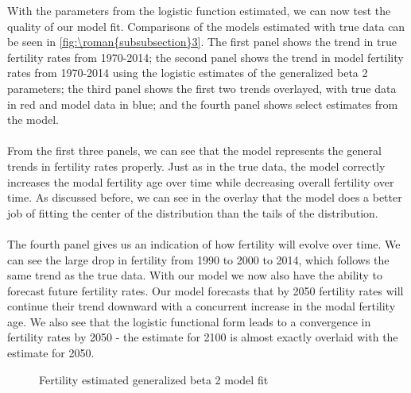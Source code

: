 \documentclass{article}
\renewcommand{\thesubsubsection}{\roman{subsubsection}}
\numberwithin{equation}{subsection}
\newcommand*{\FigureDir}{../../graphs}
\begin{document}
\begin{appendices}
\noindent
With the parameters from the logistic function estimated, we can now test the quality of our model fit. Comparisons of the models estimated with true data can be seen in \autoref{fig:\thesubsubsection3}. The first panel shows the trend in true fertility rates from 1970-2014; the second panel shows the trend in model fertility rates from 1970-2014 using the logistic estimates of the generalized beta 2 parameters; the third panel shows the first two trends overlayed, with true data in red and model data in blue; and the fourth panel shows select estimates from the model.
\\\\
From the first three panels, we can see that the model represents the general trends in fertility rates properly. Just as in the true data, the model correctly increases the modal fertility age over time while decreasing overall fertility over time. As discussed before, we can see in the overlay that the model does a better job of fitting the center of the distribution than the tails of the distribution.
\\\\
The fourth panel gives us an indication of how fertility will evolve over time. We can see the large drop in fertility from 1990 to 2000 to 2014, which follows the same trend as the true data. With our model we now also have the ability to forecast future fertility rates. Our model forecasts that by 2050 fertility rates will continue their trend downward with a concurrent increase in the modal fertility age. We also see that the logistic functional form leads to a convergence in fertility rates by 2050 - the estimate for 2100 is almost exactly overlaid with the estimate for 2050.

\begin{figure}[H]
   \centering
   \caption{\label{fig:\thesubsubsection3}Fertility estimated generalized beta 2 model fit}
\end{figure}


\end{appendices}
\end{document}
